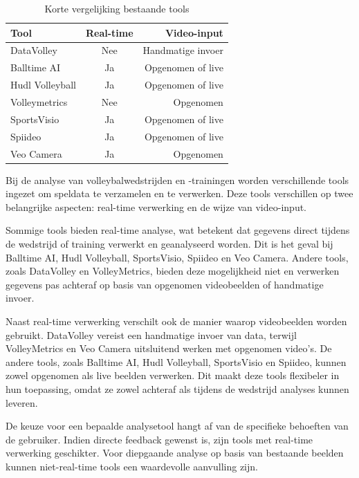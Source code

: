 \begin{table}
  \centering
  \begin{tabular}{lcr}
    \toprule
    \textbf{Tool} & \textbf{Real-time} & \textbf{Video-input}\\
    \midrule
    DataVolley & Nee & Handmatige invoer \\
    Balltime AI & Ja & Opgenomen of live \\
    Hudl Volleyball & Ja & Opgenomen of live \\
    Volleymetrics & Nee & Opgenomen \\
    SportsVisio & Ja & Opgenomen of live \\
    Spiideo & Ja & Opgenomen of live \\
    Veo Camera & Ja & Opgenomen \\
    \bottomrule
  \end{tabular}
  \caption[Korte vergelijking bestaande tools]{\label{tab:tools}Korte vergelijking bestaande tools}
\end{table}

Bij de analyse van volleybalwedstrijden en -trainingen worden verschillende tools ingezet om speldata te verzamelen en te verwerken. Deze tools verschillen op twee belangrijke aspecten: real-time verwerking en de wijze van video-input.

Sommige tools bieden real-time analyse, wat betekent dat gegevens direct tijdens de wedstrijd of training verwerkt en geanalyseerd worden. Dit is het geval bij Balltime AI, Hudl Volleyball, SportsVisio, Spiideo en Veo Camera. Andere tools, zoals DataVolley en VolleyMetrics, bieden deze mogelijkheid niet en verwerken gegevens pas achteraf op basis van opgenomen videobeelden of handmatige invoer.

Naast real-time verwerking verschilt ook de manier waarop videobeelden worden gebruikt. DataVolley vereist een handmatige invoer van data, terwijl VolleyMetrics en Veo Camera uitsluitend werken met opgenomen video’s. De andere tools, zoals Balltime AI, Hudl Volleyball, SportsVisio en Spiideo, kunnen zowel opgenomen als live beelden verwerken. Dit maakt deze tools flexibeler in hun toepassing, omdat ze zowel achteraf als tijdens de wedstrijd analyses kunnen leveren.

De keuze voor een bepaalde analysetool hangt af van de specifieke behoeften van de gebruiker. Indien directe feedback gewenst is, zijn tools met real-time verwerking geschikter. Voor diepgaande analyse op basis van bestaande beelden kunnen niet-real-time tools een waardevolle aanvulling zijn.